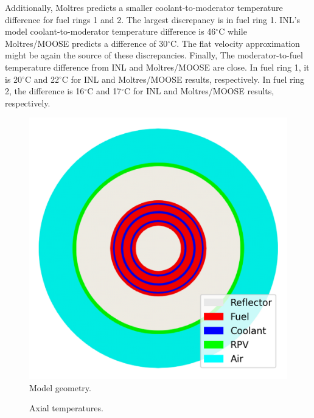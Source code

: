 Additionally, Moltres predicts a smaller coolant-to-moderator temperature difference for fuel rings 1 and 2.
The largest discrepancy is in fuel ring 1.
INL's model coolant-to-moderator temperature difference is 46$^{\circ}$C while Moltres/MOOSE predicts a difference of 30$^{\circ}$C.
The flat velocity approximation might be again the source of these discrepancies.
Finally, The moderator-to-fuel temperature difference from INL and Moltres/MOOSE are close.
In fuel ring 1, it is 20$^{\circ}$C and 22$^{\circ}$C for INL and Moltres/MOOSE results, respectively.
In fuel ring 2, the difference is 16$^{\circ}$C and 17$^{\circ}$C for INL and Moltres/MOOSE results, respectively.

\begin{figure}[htbp!]
  \centering
  \includegraphics[width=0.4\linewidth]{figures-thermal/ex2a-meshC2}
  \hfill
  \caption{Model geometry.}
  \label{fig:ex2a-2nd-model}
\end{figure}

\begin{figure}[htbp!]
  \centering
  \hfill
  \caption{Axial temperatures.}
  \label{fig:ex2a-temps}
\end{figure}

